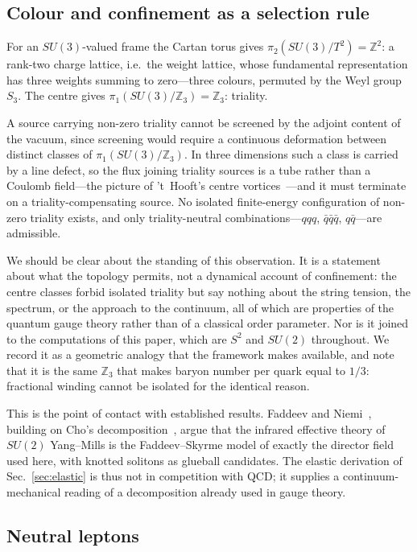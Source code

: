 \documentclass[aps,prd,preprint,nofootinbib,longbibliography]{revtex4-2}
\begin{document}
\subsection{Colour and confinement as a selection rule}

For an $SU(3)$-valued frame the Cartan torus gives
$\pi_2(SU(3)/T^2)=\mathbb{Z}^2$: a rank-two charge lattice, i.e.\ the weight
lattice, whose fundamental representation has three weights summing to
zero---three colours, permuted by the Weyl group $S_3$. The centre gives
$\pi_1(SU(3)/\mathbb{Z}_3)=\mathbb{Z}_3$: triality.

A source carrying non-zero triality cannot be screened by the adjoint content of
the vacuum, since screening would require a continuous deformation between
distinct classes of $\pi_1(SU(3)/\mathbb{Z}_3)$. In three dimensions such a class
is carried by a line defect, so the flux joining triality sources is a tube
rather than a Coulomb field---the picture of 't~Hooft's centre
vortices~\cite{thooft1978}---and it must terminate on a triality-compensating
source. No isolated finite-energy configuration of non-zero triality exists, and
only triality-neutral combinations---$qqq$, $\bar q\bar q\bar q$, $q\bar q$---are
admissible.

We should be clear about the standing of this observation. It is a statement
about what the topology permits, not a dynamical account of confinement: the
centre classes forbid isolated triality but say nothing about the string tension,
the spectrum, or the approach to the continuum, all of which are properties of
the quantum gauge theory rather than of a classical order parameter. Nor is it
joined to the computations of this paper, which are $S^2$ and $SU(2)$ throughout.
We record it as a geometric analogy that the framework makes available, and note
that it is the same $\mathbb{Z}_3$ that makes baryon number per quark equal to
$1/3$: fractional winding cannot be isolated for the identical reason.

This is the point of contact with established results. Faddeev and
Niemi~\cite{faddeev1997,faddeev1999}, building on Cho's
decomposition~\cite{cho1980}, argue that the infrared effective theory of $SU(2)$
Yang--Mills is the Faddeev--Skyrme model of exactly the director field used here,
with knotted solitons as glueball candidates. The elastic derivation of
Sec.~\ref{sec:elastic} is thus not in competition with QCD; it supplies a
continuum-mechanical reading of a decomposition already used in gauge theory.

\subsection{Neutral leptons}
\end{document}
